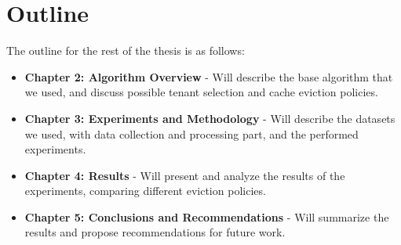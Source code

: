 \section{Outline}

The outline for the rest of the thesis is as follows:

\begin{itemize}
    \item \textbf{Chapter 2: Algorithm Overview} - Will describe the base algorithm that we used, and discuss possible tenant selection and cache eviction policies.
    \item \textbf{Chapter 3: Experiments and Methodology} - Will describe the datasets we used, with data collection and processing part, and the performed experiments.
    \item \textbf{Chapter 4: Results} - Will present and analyze the results of the experiments, comparing different eviction policies.
    \item \textbf{Chapter 5: Conclusions and Recommendations} - Will summarize the results and propose recommendations for future work.
\end{itemize}